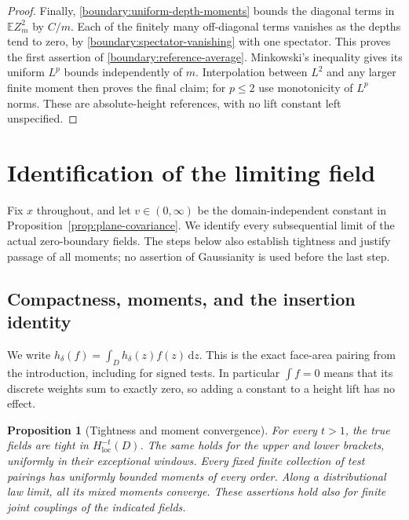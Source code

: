 \documentclass[11pt]{article}
\newtheorem{proposition}[theorem]{Proposition}
\theoremstyle{definition}
\theoremstyle{remark}
\numberwithin{equation}{section}
\begin{document}
\begin{proof}
Finally, \eqref{boundary:uniform-depth-moments} bounds the diagonal
terms in $\mathbb E Z_m^2$ by $C/m$.  Each of the finitely many off-diagonal
terms vanishes as the depths tend to zero, by
\eqref{boundary:spectator-vanishing} with one spectator.  This proves
the first assertion of \eqref{boundary:reference-average}.
Minkowski's inequality gives its uniform $L^p$ bounds independently
of $m$.  Interpolation between $L^2$ and any larger finite moment
then proves the final claim; for $p\le2$ use monotonicity of
$L^p$ norms.  These are absolute-height references, with no lift
constant left unspecified.
\end{proof}

\section{Identification of the limiting field}
\label{sec:limit}

Fix \(x\) throughout, and let \(v\in(0,\infty)\) be the
domain-independent constant in Proposition~\ref{prop:plane-covariance}.
We identify every subsequential limit of the actual zero-boundary
fields.  The steps below also establish tightness and justify passage
of all moments; no assertion of Gaussianity is used before the last
step.

\subsection{Compactness, moments, and the insertion identity}

We write \(h_\delta(f)=\int_D h_\delta(z)f(z)\,\mathrm d z\).
This is the exact face-area pairing from the introduction, including
for signed tests.  In particular \(\int f=0\) means that its discrete
weights sum to exactly zero, so adding a constant to a height lift has
no effect.

\begin{proposition}[Tightness and moment convergence]
\label{prop:tightness}
For every \(t>1\), the true fields are tight in
\(H^{-t}_{\mathrm{loc}}(D)\).  The same holds for the upper and lower
brackets, uniformly in their exceptional windows.  Every fixed finite
collection of test pairings has uniformly bounded moments of every
order.  Along a distributional law limit, all its mixed moments
converge.  These assertions hold also for finite joint couplings of
the indicated fields.
\end{proposition}
\end{document}
